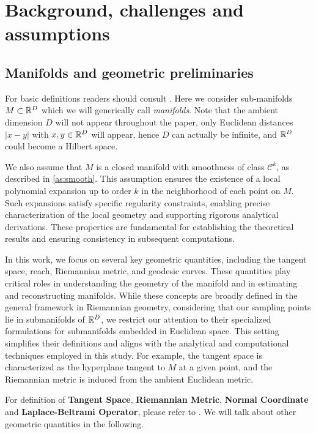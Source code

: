 \section{Background, challenges and assumptions}
\label{sec:problem}

\subsection{Manifolds and geometric preliminaries}
For basic definitions readers should consult \cite{do1992riemannian,lee2003introduction,lee2018introduction}. Here we consider sub-manifolds $M\subset \mathbb{R}^D$ which we will generically call {\em manifolds}. Note that the ambient dimension $D$ will not appear throughout the paper, only Euclidean distances $|x-y|$ with $x,y\in \mathbb{R}^D$ will appear, hence $D$ can actually be infinite, and $\mathbb{R}^D$ could become a Hilbert space.

We also assume that $M$ is a closed manifold with smoothness of class $\mathcal{C}^k$, as described in \cref{as:smooth}. This assumption ensures the existence of a local polynomial expansion up to order $k$ in the neighborhood of each point on $M$. Such expansions satisfy specific regularity constraints, enabling precise characterization of the local geometry and supporting rigorous analytical derivations. These properties are fundamental for establishing the theoretical results and ensuring consistency in subsequent computations.

In this work, we focus on several key geometric quantities, including the tangent space, reach, Riemannian metric, and geodesic curves. These quantities play critical roles in understanding the geometry of the manifold and in estimating and reconstructing manifolds. While these concepts are broadly defined in the general framework in Riemannian geometry, considering that our sampling points lie in submanifolds of $\mathbb{R}^D$, we restrict our attention to their specialized formulations for submanifolds embedded in Euclidean space. This setting simplifies their definitions and aligns with the analytical and computational techniques employed in this study. For example, the tangent space is characterized as the hyperplane tangent to $M$ at a given point, and the Riemannian metric is induced from the ambient Euclidean metric. 

For definition of \textbf{Tangent Space}, \textbf{Riemannian Metric}, \textbf{Normal Coordinate} and \textbf{Laplace-Beltrami Operator}, please refer to \cite{lee2018introduction}. We will talk about other geometric quantities in the following.

